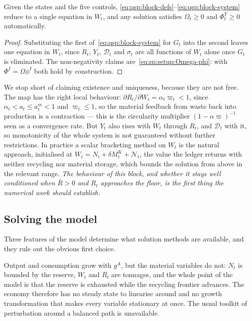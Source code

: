 \begin{lemma}\label{lem:qsp:block}
Given the states and the five controls, \eqref{eq:qsp:block-defs}--\eqref{eq:qsp:block-system} reduce to
a single equation in $W_t$, and any solution satisfies $\Omega_t\ge0$ and $\Phi^Y_t\ge0$
automatically.
\end{lemma}

\begin{proof}
Substituting the first of~\eqref{eq:qsp:block-system} for $G_t$ into the second leaves one equation in
$W_t$, since $R_t$, $Y_t$, $\mathcal D_t$ and $\sigma_t$ are all functions of $W_t$ alone once $G_t$ is
eliminated. The non-negativity claims are~\eqref{eq:sp:setup:Omega-phi}: with $\Phi^I=\Omega\phi^I$ both
hold by construction.
\end{proof}

We stop short of claiming existence and uniqueness, because they are not free. The map has the right
local behaviour: $\partial R_t/\partial W_t=\alpha_t\varpi_t<1$, since
$\alpha_t<a_t\le a^m_t<1$ and $\varpi_t\le1$, so the material feedback from waste back into production
is a contraction --- this is the circularity multiplier $\left(1-\alpha\varpi\right)^{-1}$ seen as a
convergence rate. But $Y_t$ also rises with $W_t$ through $R_t$, and $\mathcal D_t$ with it, so
monotonicity of the whole system is not guaranteed without further restrictions. In practice a scalar
bracketing method on $W_t$ is the natural approach, initialised at
$W_t=N_t+\delta M^K_t+\mathcal N_t$, the value the ledger returns with neither recycling nor material
storage, which bounds the solution from above in the relevant range. \emph{The behaviour of this block,
and whether it stays well conditioned when $\bar R>0$ and $R_t$ approaches the floor, is the first
thing the numerical work should establish.}

\subsection{Solving the model}\label{sec:qsp:model:solution}

Three features of the model determine what solution methods are available, and they rule out the
obvious first choice.

 Output and consumption grow with $g^A$, but
the material variables do not: $N_t$ is bounded by the reserve, $W_t$ and $R_t$ are tonnages, and the
whole point of the model is that the reserve is exhausted while the recycling frontier advances. The
economy therefore has no steady state to linearise around and no growth transformation that makes every
variable stationary at once. The usual toolkit of perturbation around a balanced path is unavailable.

